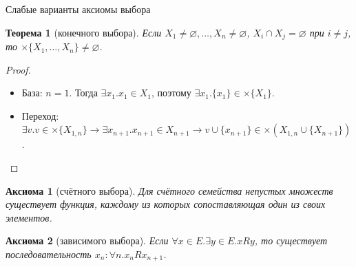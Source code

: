 \documentclass[aspectratio=169]{beamer}
\newtheorem{thm}{Теорема}[section]
\newtheorem{axm}{Аксиома}[section]
\begin{document}
\begin{frame}{Слабые варианты аксиомы выбора}

\begin{thm}[конечного выбора]
Если $X_1\ne\varnothing, \dots, X_n\ne\varnothing$, $X_i\cap X_j = \varnothing$ при $i \ne j$, то $\times \{X_1, \dots, X_n\} \ne \varnothing$.
\end{thm}

\begin{proof}
\begin{itemize}\item База: $n=1$. Тогда $\exists x_1.x_1 \in X_1$, поэтому $\exists x_1.\{x_1\} \in \times \{X_1\}$.

\item Переход: %
$\exists v.v \in \times \{X_{1,n}\}\rightarrow\exists x_{n+1}.x_{n+1} \in X_{n+1}\rightarrow
v \cup \{x_{n+1}\} \in \times (X_{1,n}\cup\{X_{n+1}\})$.
\end{itemize}\vspace{-0.3cm}\end{proof}




\begin{axm}[счётного выбора]
Для счётного семейства непустых множеств существует функция, каждому из которых сопоставляющая один из своих элементов.
\end{axm}

\begin{axm}[зависимого выбора]
Если $\forall x \in E.\exists y \in E. x R y$, то существует последовательность $x_n: \forall n.x_n R x_{n+1}$.
\end{axm}
\end{frame}
\end{document}
